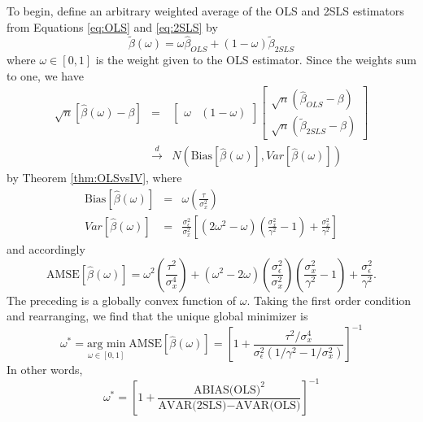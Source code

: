 \documentclass[12pt]{article}
\theoremstyle{definition}
\begin{document}
To begin, define an arbitrary weighted average of the OLS and 2SLS estimators from Equations \ref{eq:OLS} and \ref{eq:2SLS} by  
\begin{equation}
	\widetilde{\beta}(\omega) = \omega \widehat{\beta}_{OLS} + (1 - \omega) \widetilde{\beta}_{2SLS}
\end{equation}
where $\omega \in [0,1]$ is the weight given to the OLS estimator.
Since the weights sum to one, we have
\begin{eqnarray*}
	\sqrt{n}\left[\widehat{\beta}(\omega) - \beta \right] &=& \left[ \begin{array}
	{cc} \omega & (1 - \omega)
\end{array}\right] \left[
\begin{array}{c}
  \sqrt{n}(\widehat{\beta}_{OLS} - \beta) \\
  \sqrt{n}(\widetilde{\beta}_{2SLS} - \beta)
\end{array}
\right]\\
& \overset{d}{\rightarrow} & N\left(\mbox{Bias}\left[\widehat{\beta}(\omega)\right], Var\left[\widehat{\beta}(\omega)\right] \right)
\end{eqnarray*}
by Theorem \ref{thm:OLSvsIV}, where
\begin{eqnarray*}
	\mbox{Bias}\left[\widehat{\beta}(\omega)\right] &=& \omega \left( \frac{\tau}{\sigma_x^2} \right) \\
	 Var\left[\widehat{\beta}(\omega)\right] &=&  \frac{\sigma_\epsilon^2}{\sigma_x^2} \left[(2\omega^2 - \omega)\left( \frac{\sigma_x^2}{\gamma^2} - 1\right)+\frac{\sigma_x^2}{\gamma^2} \right]
\end{eqnarray*}
and accordingly
\begin{equation}
	\mbox{AMSE}\left[\widehat{\beta}(\omega) \right] =  \omega^2 \left(\frac{\tau^2}{\sigma_x^4} \right) + (\omega^2 - 2 \omega)\left(\frac{\sigma_\epsilon^2}{\sigma_x^2}\right)\left( \frac{\sigma_x^2}{\gamma^2} - 1\right) + \frac{\sigma_\epsilon^2}{\gamma^2}.
\end{equation}
The preceding is a globally convex function of $\omega$. 
Taking the first order condition and rearranging, we find that the unique global minimizer is
\begin{equation}
\label{eq:AMSEoptimal}
	\omega^* = \underset{\omega \in [0,1]}{\mbox{arg min}}\; \mbox{AMSE}\left[\widehat{\beta}(\omega) \right] 
	=\left[1 + \frac{\tau^2/\sigma_x^4}{\sigma_\epsilon^2(1/\gamma^2 - 1/\sigma_x^2)}\right]^{-1}
\end{equation}
In other words,
$$\omega^* = \left[1 + \frac{\mbox{ABIAS(OLS)}^2}{\mbox{AVAR(2SLS)}-\mbox{AVAR(OLS)}} \right]^{-1}$$
\end{document}
